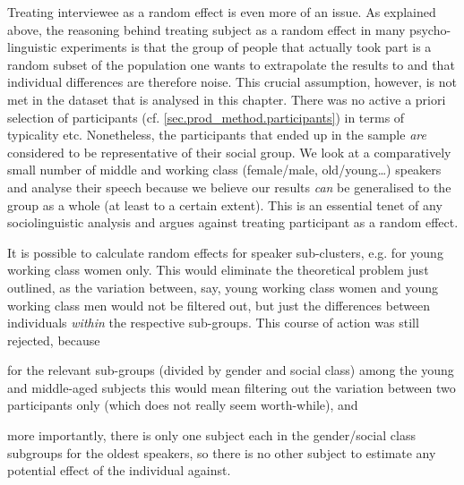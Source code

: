 Treating interviewee as a random effect is even more of an issue.
As explained above, the reasoning behind treating subject as a random effect in many psycho-linguistic experiments is that the group of people that actually took part is a random subset of the population one wants to extrapolate the results to and that individual differences are therefore noise.
This crucial assumption, however, is not met in the dataset that is analysed in this chapter.
There was no active a priori selection of participants (cf. \ref{sec.prod_method.participants}) in terms of typicality etc.
Nonetheless, the participants that ended up in the sample \emph{are} considered to be representative of their social group.
We look at a comparatively small number of middle and working class (female/male, old/young\ldots) speakers and analyse their speech because we believe our results \emph{can} be generalised to the group as a whole (at least to a certain extent).
This is an essential tenet of any sociolinguistic analysis and argues against treating participant as a random effect.

It is possible to calculate random effects for speaker sub-clusters, e.g. for young working class women only.
This would eliminate the theoretical problem just outlined, as the variation between, say, young working class women and young working class men would not be filtered out, but just the differences between individuals \emph{within} the respective sub-groups.
This course of action was still rejected, because
	\begin{inparaenum}[(a)]
		\item for the relevant sub-groups (divided by gender and social class) among the young and middle-aged subjects this would mean filtering out the variation between two participants only (which does not really seem worth-while), and
		\item more importantly, there is only one subject each in the gender/social class subgroups for the oldest speakers, so there is no other subject to estimate any potential effect of the individual against.		
	\end{inparaenum}

